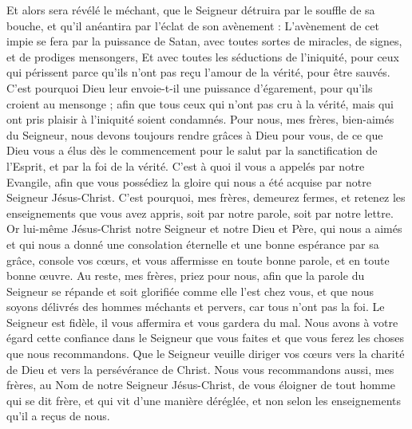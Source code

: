 \begin{multicols}{2}
Et alors sera révélé le méchant, que le Seigneur détruira par le souffle de sa bouche, et qu’il anéantira par l’éclat de son avènement :
L'avènement de cet impie se fera par la puissance de Satan, avec toutes sortes de miracles, de signes, et de prodiges mensongers,
Et avec toutes les séductions de l’iniquité, pour ceux qui périssent parce qu'ils n'ont pas reçu l'amour de la vérité, pour être sauvés.
C'est pourquoi Dieu leur envoie-t-il une puissance d’égarement, pour qu’ils croient au mensonge ;
afin que tous ceux qui n’ont pas cru à la vérité, mais qui ont pris plaisir à l’iniquité soient condamnés.
Pour nous, mes frères, bien-aimés du Seigneur, nous devons toujours rendre grâces à Dieu pour vous, de ce que Dieu vous a élus dès le commencement pour le salut par la sanctification de l'Esprit, et par la foi de la vérité.
C’est à quoi il vous a appelés par notre Evangile, afin que vous possédiez la gloire qui nous a été acquise par notre Seigneur Jésus-Christ.
C'est pourquoi, mes frères, demeurez fermes, et retenez les enseignements que vous avez appris, soit par notre parole, soit par notre lettre.
Or lui-même Jésus-Christ notre Seigneur et notre Dieu et Père, qui nous a aimés et qui nous a donné une consolation éternelle et une bonne espérance par sa grâce,
console vos cœurs, et vous affermisse en toute bonne parole, et en toute bonne œuvre.
\VerseOne{}Au reste, mes frères, priez pour nous, afin que la parole du Seigneur se répande et soit glorifiée comme elle l'est chez vous,
et que nous soyons délivrés des hommes méchants et pervers, car tous n’ont pas la foi.
Le Seigneur est fidèle, il vous affermira et vous gardera du mal.
Nous avons à votre égard cette confiance dans le Seigneur que vous faites et que vous ferez les choses que nous recommandons.
Que le Seigneur veuille diriger vos cœurs vers la charité de Dieu et vers la persévérance de Christ.
Nous vous recommandons aussi, mes frères, au Nom de notre Seigneur Jésus-Christ, de vous éloigner de tout homme qui se dit frère, et qui vit d’une manière déréglée, et non selon les enseignements qu'il a reçus de nous.

\end{multicols}

